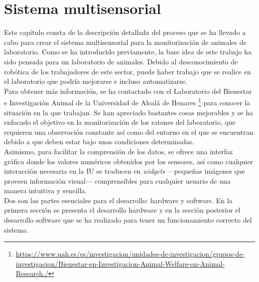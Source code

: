 \chapter{Sistema multisensorial }
\label{cap:capitulo4}



\vspace{1cm}
Este capítulo consta de la descripción detallada del proceso que se ha llevado a cabo para crear el sistema multisensorial para la monitorización de animales de laboratorio. Como se ha introducido previamente, la base idea de este trabajo ha sido pensada para un laboratorio de animales. Debido al desconocimiento de robótica de los trabajadores de este sector, puede haber trabajo que se realice en el laboratorio que podría mejorarse e incluso automatizarse.\\

Para obtener más información, se ha contactado con el Laboratorio del Bienestar e Investigación Animal de la Universidad de Alcalá de Henares \footnote{\url{https://www.uah.es/es/investigacion/unidades-de-investigacion/grupos-de-investigacion/Bienestar-en-Investigacion-Animal-Welfare-on-Animal-Research./}} para conocer la situación en la que trabajan. Se han apreciado bastantes cosas mejorables y se ha enfocado el objetivo en la monitorización de los ratones del laboratorio, que requieren una observación constante así como del entorno en el que se encuentran debido a que deben estar bajo unas condiciones determinadas.\\

Asimismo, para facilitar la comprensión de los datos, se ofrece una interfaz gráfica donde los valores numéricos obtenidos por los sensores, así como cualquier interacción necesaria en la IU se traducen en \textit{widgets} ---pequeñas imágenes que proveen información visual--- comprensibles para cualquier usuario de una manera intuitiva y sencilla.\\

Dos son las partes esenciales para el desarrollo: hardware y software. En la primera sección se presenta el desarrollo hardware y en la sección posterior el desarrollo software que se ha realizado para tener un funcionamiento correcto del sistema.

